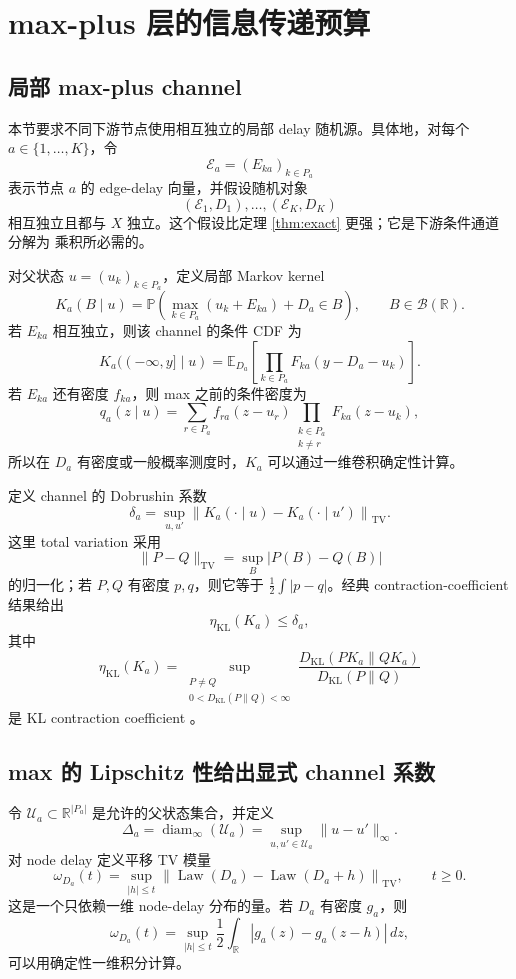 \documentclass[a4paper,11pt]{article}
\theoremstyle{definition}
\newcommand{\R}{\mathbb R}
\newcommand{\E}{\mathbb E}
\newcommand{\Prob}{\mathbb P}
\newcommand{\1}{\mathbf 1}
\newcommand{\TV}{\mathrm{TV}}
\newcommand{\KL}{\mathrm{KL}}
\newcommand{\diam}{\operatorname{diam}}
\newcommand{\Law}{\operatorname{Law}}
\begin{document}
\section{max-plus 层的信息传递预算}

\subsection{局部 max-plus channel}

本节要求不同下游节点使用相互独立的局部 delay 随机源。具体地，对每个
$a\in\{1,\ldots,K\}$，令
\[
\mathcal E_a=(E_{ka})_{k\in P_a}
\]
表示节点 $a$ 的 edge-delay 向量，并假设随机对象
\[
(\mathcal E_1,D_1),\ldots,(\mathcal E_K,D_K)
\]
相互独立且都与 $X$ 独立。这个假设比定理 \ref{thm:exact} 更强；它是下游条件通道分解为
乘积所必需的。

对父状态 $u=(u_k)_{k\in P_a}$，定义局部 Markov kernel
\[
K_a(B\mid u)
=
\Prob\left(
\max_{k\in P_a}(u_k+E_{ka})+D_a\in B
\right),
\qquad B\in\mathcal B(\R).
\]
若 $E_{ka}$ 相互独立，则该 channel 的条件 CDF 为
\[
K_a((-\infty,y]\mid u)
=
\E_{D_a}\left[
\prod_{k\in P_a}F_{ka}(y-D_a-u_k)
\right].
\]
若 $E_{ka}$ 还有密度 $f_{ka}$，则 max 之前的条件密度为
\[
q_a(z\mid u)
=
\sum_{r\in P_a}
f_{ra}(z-u_r)
\prod_{\substack{k\in P_a\\k\ne r}}
F_{ka}(z-u_k),
\]
所以在 $D_a$ 有密度或一般概率测度时，$K_a$ 可以通过一维卷积确定性计算。

定义 channel 的 Dobrushin 系数
\[
\delta_a
=
\sup_{u,u'}
\left\|
K_a(\cdot\mid u)-K_a(\cdot\mid u')
\right\|_{\TV}.
\]
这里 total variation 采用
\[
\|P-Q\|_{\TV}=\sup_B|P(B)-Q(B)|
\]
的归一化；若 $P,Q$ 有密度 $p,q$，则它等于
$\frac12\int|p-q|$。经典 contraction-coefficient 结果给出
\[
\eta_{\KL}(K_a)\le \delta_a,
\]
其中
\[
\eta_{\KL}(K_a)
=
\sup_{\substack{P\ne Q\\0<D_{\KL}(P\|Q)<\infty}}
\frac{D_{\KL}(PK_a\|QK_a)}{D_{\KL}(P\|Q)}
\]
是 KL contraction coefficient \cite{Cohen1993,PolyanskiyWu2017}。

\subsection{max 的 Lipschitz 性给出显式 channel 系数}

令 $\mathcal U_a\subset\R^{|P_a|}$ 是允许的父状态集合，并定义
\[
\Delta_a
=
\diam_\infty(\mathcal U_a)
=
\sup_{u,u'\in\mathcal U_a}\|u-u'\|_\infty.
\]
对 node delay 定义平移 TV 模量
\[
\omega_{D_a}(t)
=
\sup_{|h|\le t}
\left\|
\Law(D_a)-\Law(D_a+h)
\right\|_{\TV},
\qquad t\ge0.
\]
这是一个只依赖一维 node-delay 分布的量。若 $D_a$ 有密度 $g_a$，则
\[
\omega_{D_a}(t)
=
\sup_{|h|\le t}
\frac12\int_\R|g_a(z)-g_a(z-h)|\,dz,
\]
可以用确定性一维积分计算。
\end{document}
